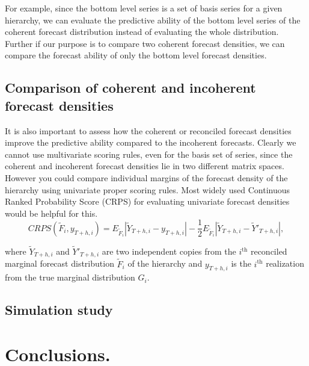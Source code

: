 \documentclass[a4paper, 11pt]{article}
\begin{document}
\noindent
For example, since the bottom level series is a set of basis series for a given hierarchy, we can evaluate the predictive ability of the bottom level series of the coherent forecast distribution instead of evaluating the whole distribution. Further if our purpose is to compare two coherent forecast densities, we can compare the forecast ability of only the bottom level forecast densities. 


\subsection{Comparison of coherent and incoherent forecast densities}

It is also important to assess how the coherent or reconciled forecast densities improve the predictive ability compared to the incoherent forecasts. Clearly we cannot use multivariate scoring rules, even for the basis set of series, since the coherent and incoherent forecast densities lie in two different matrix spaces.\\

\noindent
However you could compare individual margins of the forecast density of the hierarchy using univariate proper scoring rules. Most widely used Continuous Ranked Probability Score (CRPS) for evaluating univariate forecast densities would be helpful for this. \\

\begin{equation} \label{eq:(3.6)}
CRPS(\tilde{F}_i,y_{T+h,i}) = E_{\tilde{F}_i}|\tilde{Y}_{T+h,i}-y_{T+h,i}| - \frac{1}{2}E_{\tilde{F}_i}|\tilde{Y}_{T+h,i}-\tilde{Y}'_{T+h,i}|,
\end{equation}
       
\noindent
where $\tilde{Y}_{T+h,i}$ and $\tilde{Y}'_{T+h,i}$ are two independent copies from the $i^{\text{th}}$ reconciled marginal forecast distribution $\tilde{F}_i$ of the hierarchy and $y_{T+h,i}$ is the $i^{\text{th}}$ realization from the true marginal distribution $G_i$. 
 



\subsection{Simulation study}

\section{Conclusions.}




   



\newpage
\printbibliography
\end{document}
